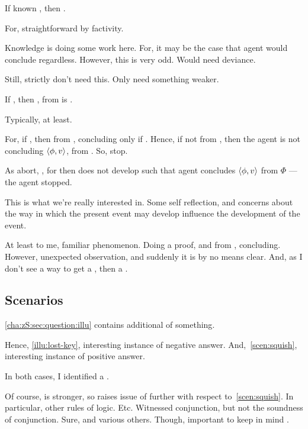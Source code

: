 \begin{note}
  \begin{proposition}
    If known \requ{}, then \curb{}.
    \begin{argument}
      For, straightforward by factivity.
    \end{argument}
  \end{proposition}

  Knowledge is doing some work here.
  For, it may be the case that agent would conclude regardless.
  However, this is very odd.
  Would need deviance.

  Still, strictly don't need this.
  Only need something weaker.

  \begin{proposition}[Feedback]
    If \requ{}, then \fc{}, from \agpe{} is \curb{}.
    \begin{argument}
      Typically, at least.

      For, if \requ{}, then from \agpe{}, concluding only if \fc{}.
      Hence, if not \fc{} from \agpe{}, then the agent is not concluding \(\langle \phi, v \rangle\), from .
      So, stop.

      As abort, \curb{}, for then does not develop such that agent concludes \(\langle \phi, v \rangle\) from \(\Phi\) --- the agent stopped.
    \end{argument}
  \end{proposition}

  This is what we're really interested in.
  Some self reflection, and concerns about the way in which the present event may develop influence the development of the event.

  At least to me, familiar phenomenon.
  Doing a proof, and from , concluding.
  However, unexpected observation, and suddenly it is by no means clear.
  And, as I don't see a way to get a \fc{}, then a \curb{}.
\end{note}

\subsection{Scenarios}
\label{cha:zS:sec:question:scenarios}

\begin{note}
  \autoref{cha:zS:sec:question:illu} contains additional  of {\color{red} something}.
\end{note}

\begin{note}
  Hence, \autoref{illu:lost-key}, interesting instance of negative answer.
  And,~\autoref{scen:squish}, interesting instance of positive answer.

  In both cases, I identified a \curb{}.

  Of course, \qzS{} is stronger, so raises issue of further  with respect to~\autoref{scen:squish}.
  In particular, other rules of logic.
  Etc.
  Witnessed conjunction, but not the soundness of conjunction.
  Sure, and various others.
  Though, important to keep in mind \curb{}.
\end{note}

